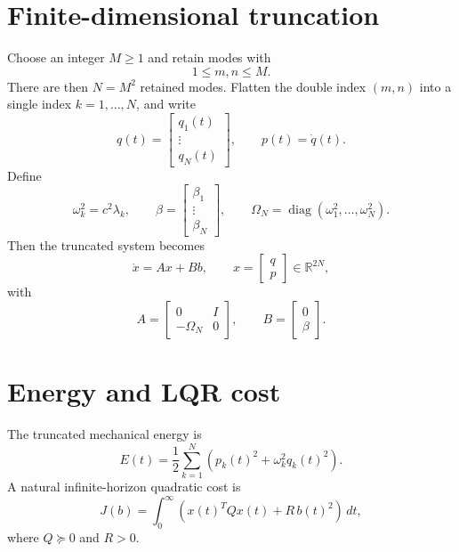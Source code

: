 \documentclass[11pt]{article}
\newcommand{\R}{\mathbb{R}}
\newcommand{\dd}{\,d}
\begin{document}
\section{Finite-dimensional truncation}
Choose an integer $M\ge 1$ and retain modes with
\[
1\le m,n\le M.
\]
There are then $N=M^2$ retained modes. Flatten the double index 
$(m,n)$ into a single index $k=1,\dots,N$, and write
\[
q(t)=\begin{bmatrix} q_1(t) \\ \vdots \\ q_N(t) \end{bmatrix},
\qquad
p(t)=\dot q(t).
\]
Define
\[
\omega_k^2=c^2\lambda_k,
\qquad
\beta=\begin{bmatrix}\beta_1 \\ \vdots \\ \beta_N\end{bmatrix},
\qquad
\Omega_N = \operatorname{diag}(\omega_1^2,\dots,\omega_N^2).
\]
Then the truncated system becomes
\begin{equation}
\label{eq:firstorder}
\dot x = A x + B b,
\qquad
x=\begin{bmatrix} q \\ p \end{bmatrix}\in\R^{2N},
\end{equation}
with
\begin{equation}
\label{eq:AB}
A=
\begin{bmatrix}
0 & I \\
-\Omega_N & 0
\end{bmatrix},
\qquad
B=
\begin{bmatrix}
0 \\
\beta
\end{bmatrix}.
\end{equation}

\section{Energy and LQR cost}
The truncated mechanical energy is
\begin{equation}
\label{eq:energy}
E(t)=\frac12\sum_{k=1}^N \left(p_k(t)^2 + \omega_k^2 q_k(t)^2\right).
\end{equation}
A natural infinite-horizon quadratic cost is
\begin{equation}
\label{eq:cost}
J(b)=\int_0^{\infty} \left( x(t)^T Q x(t) + R\,b(t)^2 \right)\dd t,
\end{equation}
where $Q\succeq 0$ and $R>0$.
\end{document}
